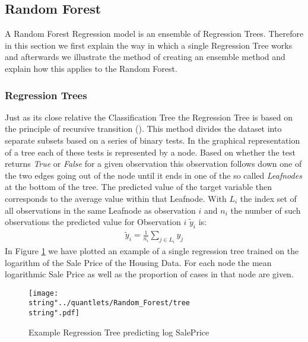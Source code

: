 \subsection{Random Forest}
A Random Forest Regression model is an ensemble of Regression Trees. Therefore in this section we first explain the way in which a single Regression Tree works and afterwards we illustrate the method of creating an ensemble method and explain how this applies to the Random Forest.
\subsubsection{Regression Trees}
Just as its close relative the Classification Tree the Regression Tree is based on the principle of recursive transition (\cite{liaw_classification_2002}). This method divides the dataset into separate subsets based on a series of binary tests. In the graphical representation of a tree each of these tests is represented by a node. Based on whether the test returns \textit{True} or \textit{False} for a given observation this observation follows down one of the two edges going out of the node until it ends in one of the so called \textit{Leafnodes} at the bottom of the tree. The predicted value of the target variable then corresponds to the average value within that Leafnode. With $L_i$ the index set of all observations in the same Leafnode as observation $i$ and $n_i$ the number of such observations the predicted value for Observation $i$ $\tilde{y}_i$ is:
\begin{align}
\tilde{y}_i = \frac{1}{n_i}\sum_{j \in L_i} y_j
\end{align}
In Figure  \ref{fig:tree} we have plotted an example of a single regression tree trained on the logarithm of the Sale Price of the Housing Data. For each node the mean logarithmic Sale Price as well as the proportion of cases in that node are given. 
\begin{figure}
  \centering
\texttt{[image: \\string"../quantlets/Random\_Forest/tree\\string".pdf]}
  \caption{Example Regression Tree predicting log SalePrice}\label{fig:tree}
\end{figure}

